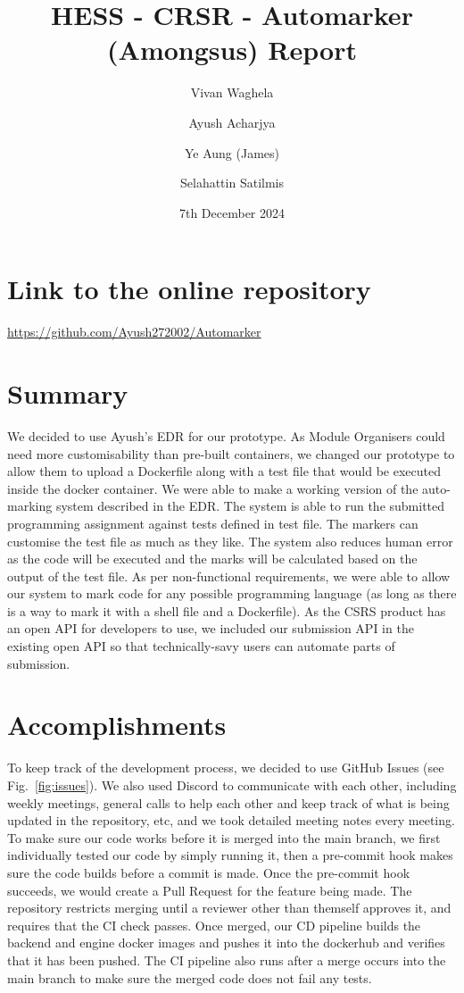 \documentclass[a4paper, 12pt]{article}
\begin{document}
\title{HESS - CRSR - Automarker (Amongsus) Report}
\author{Vivan Waghela \and Ayush Acharjya \and Ye Aung (James) \and Selahattin Satilmis}
\date{7th December 2024}
\maketitle

\section*{Link to the online repository}
\noindent\url{https://github.com/Ayush272002/Automarker}

\section*{Summary}
We decided to use Ayush's EDR for our prototype. As Module Organisers could need more customisability than pre-built containers, we changed our prototype to allow them to upload a Dockerfile along with a test file that would be executed inside the docker container. We were able to make a working version of the auto-marking system described in the EDR. The system is able to run the submitted programming assignment against tests defined in test file. The markers can customise the test file as much as they like. The system also reduces human error as the code will be executed and the marks will be calculated based on the output of the test file. As per non-functional requirements, we were able to allow our system to mark code for any possible programming language (as long as there is a way to mark it with a shell file and a Dockerfile). As the CSRS product has an open API for developers to use, we included our submission API in the existing open API so that technically-savy users can automate parts of submission.

\section*{Accomplishments}
To keep track of the development process, we decided to use GitHub Issues (see Fig.~\ref{fig:issues}). We also used Discord to communicate with each other, including weekly meetings, general calls to help each other and keep track of what is being updated in the repository, etc, and we took detailed meeting notes every meeting. To make sure our code works before it is merged into the main branch, we first individually tested our code by simply running it, then a pre-commit hook makes sure the code builds before a commit is made. Once the pre-commit hook succeeds, we would create a Pull Request for the feature being made. The repository restricts merging until a reviewer other than themself approves it, and requires that the CI check passes. Once merged, our CD pipeline builds the backend and engine docker images and pushes it into the dockerhub and verifies that it has been pushed. The CI pipeline also runs after a merge occurs into the main branch to make sure the merged code does not fail any tests.
\end{document}
